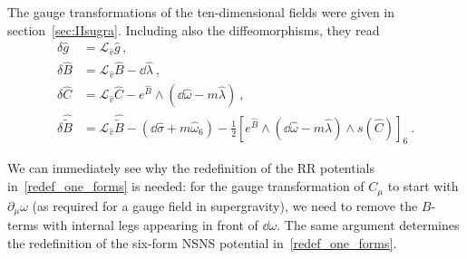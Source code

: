 \documentclass[debug]{phd}
\begin{document}
					The gauge transformations of the ten-dimensional fields were given in section~\ref{sec:IIsugra}. Including also the diffeomorphisms, they read
							\begin{equation}\label{gauge_var_full}
								\begin{split}
									\delta \hat{g} &= \mathcal{L}_{\hat{v}} \hat{g} \,, \\
									\delta \hat{B} &= \mathcal{L}_{\hat{v}} \hat{B} - \dd \hat{\lambda} \ , \\
									\delta \hat{C} &= \mathcal{L}_{\hat{v}} \hat{C} -e^{\hat{B}}\wedge(\dd \hat{\omega} - m \hat{\lambda}) \ , \\
									\delta \hat{\tilde{B}} &= \mathcal{L}_{\hat{v}} \hat{\tilde{B}} - (\dd \hat{\sigma} + m \hat{\omega}_6) - \tfrac{1}{2} [e^{\hat{B}} \wedge (\dd\hat{\omega} - m \hat{\lambda}) \wedge s(\hat{C})]_6 \ .
								\end{split}
							\end{equation}

					We can immediately see why the redefinition of the RR potentials in~\eqref{redef_one_forms} is needed: for the gauge transformation of $C_\mu$ to start with $\partial_\mu \omega$ (as required for a gauge field in supergravity), we need to remove the $B$-terms with internal legs appearing in front of $\dd \omega$. 
					The same argument determines the redefinition of the six-form NSNS potential in~\eqref{redef_one_forms}.
\end{document}
